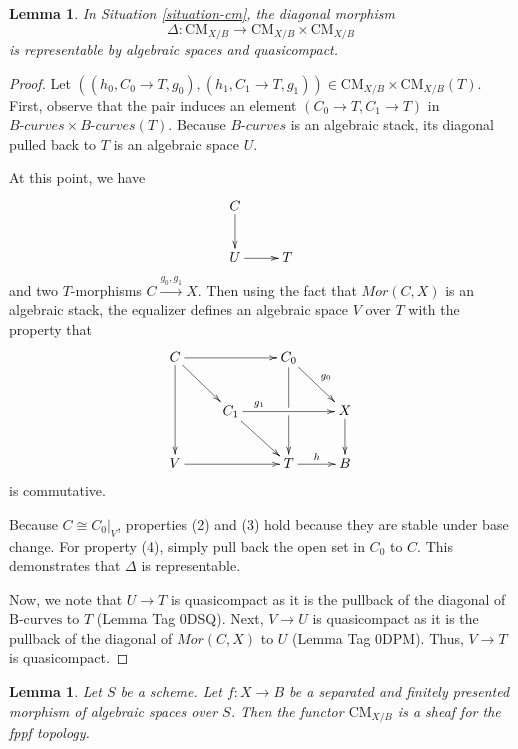 \documentclass{stacks-project}
\theoremstyle{plain}
\newtheorem{lemma}[subsection]{Lemma}
\theoremstyle{definition}
\theoremstyle{remark}
\numberwithin{equation}{subsection}
\def\CMfunctor{\mathcal{C}\!{\it oh}}
\def\CMfunctor{\text{CM}}
\begin{document}
\begin{lemma}
	In Situation \ref{situation-cm}, the diagonal morphism 
	\[\Delta:\CMfunctor_{X/B}\rightarrow\CMfunctor_{X/B}\times\CMfunctor_{X/B}\]
	is representable by algebraic spaces and quasicompact.
	\label{cm-rep-diagonal}
\end{lemma}
\begin{proof}
	Let $( (h_0,C_0\rightarrow T, g_0) ,( h_1, C_1\rightarrow T, g_1))\in \CMfunctor_{X/B}\times\CMfunctor_{X/B}(T)$.
	First, observe that the pair induces an element $(C_0\rightarrow T,C_1\rightarrow T)$ in $\textit{B-curves}\times \textit{B-curves}(T)$.
	Because $\textit{B-curves}$ is an algebraic stack, its diagonal pulled back to $T$ is an algebraic space $U$.

	At this point, we have
	\[\xymatrix{
		C\ar[d] & \\
		U\ar[r] & T
	}\]
	and two $T$-morphisms $C\xrightarrow{g_0,g_1} X$.
	Then using the fact that $Mor(C,X)$ is an algebraic stack, the equalizer defines an algebraic space $V$ over $T$ with the property that
	\[\xymatrix{
		C\ar[rr]\ar[dr]\ar[dd]&&C_0\ar[dd]|!{[dl];[dr]}\hole\ar[dr]^{g_0}&\\
		&C_1\ar[rr]^(.25){g_1}\ar[dr]& & X\ar[d]\\
		V\ar[rr]& & T\ar[r]^{h} & B
	}
	\]
	is commutative.

	Because $C\cong C_0|_V$, properties (2) and (3) hold because they are stable under base change.
	For property (4), simply pull back the open set in $C_0$ to $C$.
	This demonstrates that $\Delta$ is representable.

	Now, we note that $U\rightarrow T$ is quasicompact as it is the pullback of the diagonal of $\text{B-curves}$ to $T$ (Lemma Tag 0DSQ).
	Next, $V\rightarrow U$ is quasicompact as it is the pullback of the diagonal of $Mor(C,X)$ to $U$ (Lemma Tag 0DPM).
	Thus, $V\rightarrow T$ is quasicompact.
\end{proof}

\begin{lemma}
	Let $S$ be a scheme.
Let $f \colon X \to B$ be a separated and finitely presented morphism of algebraic spaces over $S$.
Then the functor $\CMfunctor_{X/B}$ is a sheaf for the fppf topology.
	\label{cm-is-sheaf}
\end{lemma}
\end{document}
